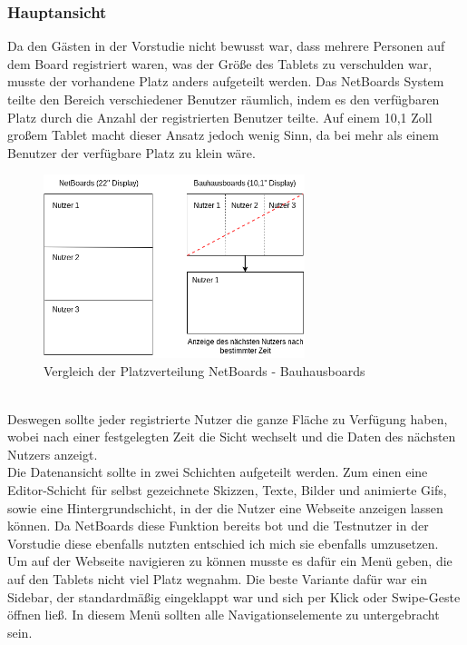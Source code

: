\subsubsection{Hauptansicht}\label{Hauptansicht}
Da den Gästen in der Vorstudie nicht bewusst war, dass mehrere Personen auf dem Board registriert waren, was der Größe des Tablets zu verschulden war, musste der vorhandene Platz anders aufgeteilt werden. Das NetBoards System teilte den Bereich verschiedener Benutzer räumlich, indem es den verfügbaren Platz durch die Anzahl der registrierten Benutzer teilte.
Auf einem 10,1 Zoll großem Tablet macht dieser Ansatz jedoch wenig Sinn, da bei mehr als einem Benutzer der verfügbare Platz zu klein wäre.
\begin{figure}[h!]
  \centering
    \includegraphics[width=0.68\textwidth]{./img/AufteilungMainView.png}
  \caption{Vergleich der Platzverteilung NetBoards - Bauhausboards}
  \label{img:aufteilungMainView}
\end{figure}
\\
Deswegen sollte jeder registrierte Nutzer die ganze Fläche zu Verfügung haben, wobei nach einer festgelegten Zeit die Sicht wechselt und die Daten des nächsten Nutzers anzeigt.
\\
Die Datenansicht sollte in zwei Schichten aufgeteilt werden. Zum einen eine Editor-Schicht für selbst gezeichnete Skizzen, Texte, Bilder und animierte Gifs, sowie eine Hintergrundschicht, in der die Nutzer eine Webseite anzeigen lassen können. Da NetBoards diese Funktion bereits bot und die Testnutzer in der Vorstudie diese ebenfalls nutzten entschied ich mich sie ebenfalls umzusetzen.
\\
Um auf der Webseite navigieren zu können musste es dafür ein Menü geben, die auf den Tablets nicht viel Platz wegnahm. Die beste Variante dafür war ein Sidebar, der standardmäßig eingeklappt war und sich per Klick oder Swipe-Geste öffnen ließ.
In diesem Menü sollten alle Navigationselemente zu untergebracht sein. 
